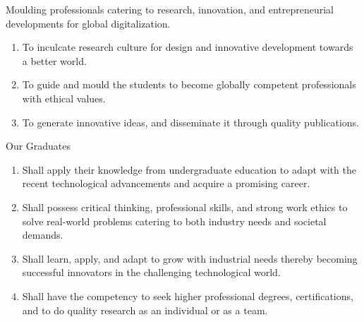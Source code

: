 \documentclass[12pt,a4paper]{report}
\begin{document}
\par\vspace{0.3cm}
\noindent Moulding professionals catering to research, innovation, and entrepreneurial
developments for global digitalization.

\vspace{0.6cm}
\par\vspace{0.2cm}
\begin{enumerate}[leftmargin=0.5in, label=\arabic*., topsep=4pt, itemsep=2pt]
    \item To inculcate research culture for design and innovative development towards a better world.
    \item To guide and mould the students to become globally competent professionals with ethical values.
    \item To generate innovative ideas, and disseminate it through quality publications.
\end{enumerate}

\vspace{0.5cm}
\par\vspace{0.2cm}
\noindent Our Graduates
\begin{enumerate}[leftmargin=0.5in, label=\arabic*., topsep=4pt, itemsep=2pt]
    \item Shall apply their knowledge from undergraduate education to adapt with the recent technological advancements and acquire a promising career.
    \item Shall possess critical thinking, professional skills, and strong work ethics to solve real-world problems catering to both industry needs and societal demands.
    \item Shall learn, apply, and adapt to grow with industrial needs thereby becoming successful innovators in the challenging technological world.
    \item Shall have the competency to seek higher professional degrees, certifications, and to do quality research as an individual or as a team.
\end{enumerate}
\clearpage
\end{document}

